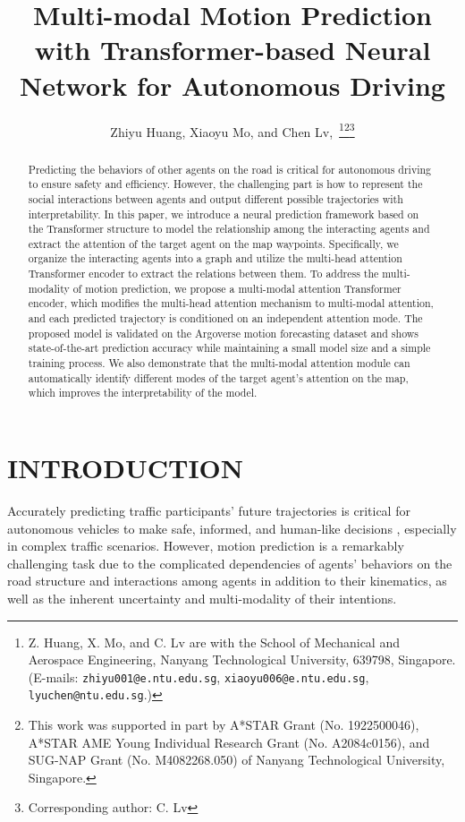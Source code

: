 \documentclass[letterpaper, 10 pt, conference]{ieeeconf}
\title{\LARGE \bf
Multi-modal Motion Prediction with Transformer-based Neural Network for Autonomous Driving
}
\author{Zhiyu Huang, Xiaoyu Mo, and Chen Lv,~\IEEEmembership{Senior Member, IEEE}\thanks{Z. Huang, X. Mo, and C. Lv are with the School of Mechanical and Aerospace Engineering, Nanyang Technological University, 639798, Singapore. (E-mails: {\tt\small zhiyu001@e.ntu.edu.sg}, {\tt\small xiaoyu006@e.ntu.edu.sg}, {\tt\small lyuchen@ntu.edu.sg}.)}\thanks{This work was supported in part by A*STAR Grant (No. 1922500046), A*STAR AME Young Individual Research Grant (No. A2084c0156), and SUG-NAP Grant (No. M4082268.050) of Nanyang Technological University, Singapore.}\thanks{Corresponding author: C. Lv}
}
\begin{document}
\maketitle
\thispagestyle{empty}
\pagestyle{empty}

\begin{abstract}

Predicting the behaviors of other agents on the road is critical for autonomous driving to ensure safety and efficiency. However, the challenging part is how to represent the social interactions between agents and output different possible trajectories with interpretability. In this paper, we introduce a neural prediction framework based on the Transformer structure to model the relationship among the interacting agents and extract the attention of the target agent on the map waypoints. Specifically, we organize the interacting agents into a graph and utilize the multi-head attention Transformer encoder to extract the relations between them. To address the multi-modality of motion prediction, we propose a multi-modal attention Transformer encoder, which modifies the multi-head attention mechanism to multi-modal attention, and each predicted trajectory is conditioned on an independent attention mode. The proposed model is validated on the Argoverse motion forecasting dataset and shows state-of-the-art prediction accuracy while maintaining a small model size and a simple training process. We also demonstrate that the multi-modal attention module can automatically identify different modes of the target agent's attention on the map, which improves the interpretability of the model.

\end{abstract}

\section{INTRODUCTION}

Accurately predicting traffic participants’ future trajectories is critical for autonomous vehicles to make safe, informed, and human-like decisions \cite{huang2021driving}, especially in complex traffic scenarios. However, motion prediction is a remarkably challenging task due to the complicated dependencies of agents' behaviors on the road structure and interactions among agents in addition to their kinematics, as well as the inherent uncertainty and multi-modality of their intentions.
\end{document}
